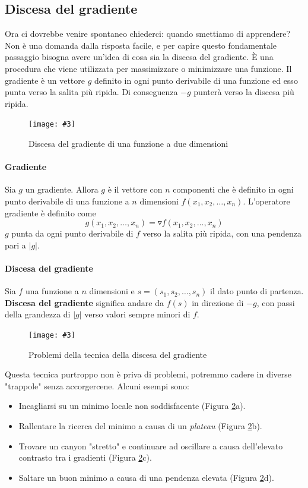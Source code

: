 \documentclass[12pt, twoside, letterpaper]{report}
\newcommand{\img}[4] {
	\begin{figure}[h]
		\caption{#1}
		\centering
		\texttt{[image: \#3]}\\
		\label{#4}
	\end{figure}
}
\begin{document}
			
			\subsection{Discesa del gradiente}
				Ora ci dovrebbe venire spontaneo chiederci: quando smettiamo di apprendere? Non è una domanda dalla risposta facile, e per capire questo fondamentale passaggio bisogna avere un'idea di cosa sia la discesa del gradiente. È una procedura che viene utilizzata per massimizzare o minimizzare una funzione. Il gradiente è un vettore $g$ definito in ogni punto derivabile di una funzione ed esso punta verso la salita più ripida. Di conseguenza $-g$ punterà verso la discesa più ripida.
				\img{Discesa del gradiente di una funzione a due dimensioni}{0.5}{gradient_descent_2d.png}{gradient_descent}

				\paragraph{Gradiente} Sia $g$ un gradiente. Allora $g$ è il vettore con $n$ componenti che è definito in ogni punto derivabile di una funzione a $n$ dimensioni $f(x_1, x_2, \dots, x_n)$. L'operatore gradiente è definito come $$g(x_1, x_2, \dots, x_n) = \triangledown f(x_1, x_2, \dots, x_n)$$
					$g$ punta da ogni punto derivabile di $f$ verso la salita più ripida, con una pendenza pari a $|g|$. \cite{kriesel}
				
				\paragraph{Discesa del gradiente} Sia $f$ una funzione a $n$ dimensioni e $s=(s_1, s_2, \dots, s_n)$ il dato punto di partenza. \textbf{Discesa del gradiente} significa andare da $f(s)$ in direzione di $-g$, con passi della grandezza di $|g|$ verso valori sempre minori di $f$. \cite{kriesel}
				
				\img{Problemi della tecnica della discesa del gradiente}{0.4}{gradient_descent.png}{gradient_descent}
				
				Questa tecnica purtroppo non è priva di problemi, potremmo cadere in diverse "trappole" senza accorgercene. Alcuni esempi sono: 
				\begin{itemize}
				 	\item Incagliarsi su un minimo locale non soddisfacente (Figura \ref{gradient_descent}a).
				 	\item Rallentare la ricerca del minimo a causa di un \textit{plateau} (Figura \ref{gradient_descent}b).
				 	\item Trovare un canyon "stretto" e continuare ad oscillare a causa dell'elevato contrasto tra i gradienti (Figura \ref{gradient_descent}c).
				 	\item Saltare un buon minimo a causa di una pendenza elevata (Figura \ref{gradient_descent}d).
				 \end{itemize} 
				 
\end{document}
